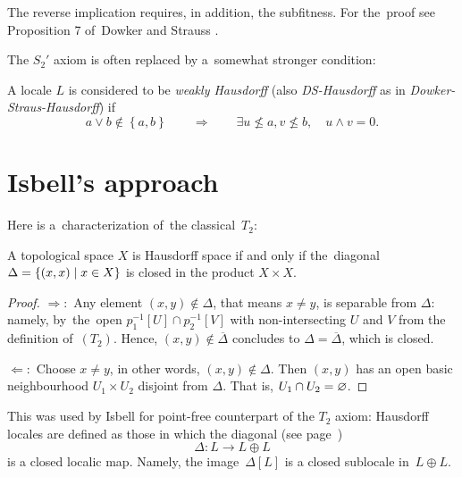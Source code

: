 \begin{rem}
  The reverse implication requires, in addition, the subfitness.
  For the~proof see Proposition 7 of~Dowker and Strauss
  \cite{ds72}.
\end{rem}

The $S_2'$ axiom is often replaced by a~somewhat stronger condition:

\begin{framed}
  \begin{df}[DS-Haus]
    A locale $L$ is considered to be \emph{weakly Hausdorff\/} (also
    \emph{DS-Hausdorff} as in \emph{Dowker-Straus-Hausdorff}) if
    \[
      a \vee b \not\in \left\{a, b\right\} \qquad \Rightarrow \qquad \exists
      u\not\leq a, v\not\leq b, \quad u \wedge v = 0.
    \]
  \end{df}
\end{framed}

\section{Isbell's approach}

Here is a~characterization of~the classical~$T_2$:

\begin{prop}
  A topological space $X$ is Hausdorff space if and only if the~diagonal
  $\Delta = \left\{(x, x) \mid x\in X \right\}$ is closed in the product
  $X\times X$.
\end{prop}

\begin{proof}
  $\Rightarrow:$ Any element $(x, y)\not\in \Delta$, that means $x \ne y$, is
  separable from $\Delta$:
  namely, by~the~open $p_1^{-1}[U] \cap p_2^{-1}[V]$ with non-intersecting $U$
  and $V$ from the definition of~$(T_2)$.
  Hence, $(x, y)\not\in \overline{\Delta}$ concludes to $\Delta =
  \overline{\Delta}$, which is closed.

  $\Leftarrow:$ Choose $x \ne y$, in other words, $(x, y)\not\in \Delta$.
  Then $(x, y)$ has an open basic neighbourhood $U_1\times U_2$ disjoint from
  $\Delta$.
  That is, $U_1 \cap U_2 = \varnothing$.
\end{proof}

This was used by Isbell \cite{isbell72} for point-free counterpart of the $T_2$
axiom:
Hausdorff locales are defined as those in which the diagonal (see
page~\pageref{codiag-in-Frm})
\[
  \Delta\colon L \to L \oplus L
\]
is a closed localic map.
Namely, the image~$\Delta[L]$ is a closed sublocale in~$L \oplus L$.

